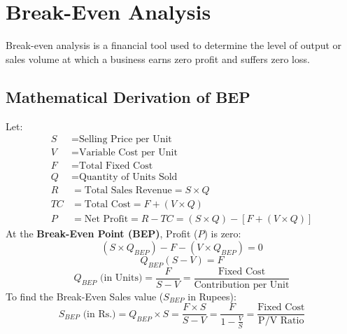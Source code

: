 \documentclass[12pt,a4paper]{article}
\begin{document}
\section{Break-Even Analysis}

Break-even analysis is a financial tool used to determine the level of output or sales volume at which a business earns zero profit and suffers zero loss.

\subsection{Mathematical Derivation of BEP}
Let:
\begin{align*}
  S &= \text{Selling Price per Unit} \\
  V &= \text{Variable Cost per Unit} \\
  F &= \text{Total Fixed Cost} \\
  Q &= \text{Quantity of Units Sold} \\
  R &= \text{Total Sales Revenue} = S \times Q \\
  TC &= \text{Total Cost} = F + (V \times Q) \\
  P &= \text{Net Profit} = R - TC = (S \times Q) - [F + (V \times Q)]
\end{align*}
At the \textbf{Break-Even Point (BEP)}, Profit ($P$) is zero:
\begin{equation*}
  (S \times Q_{BEP}) - F - (V \times Q_{BEP}) = 0
\end{equation*}
\begin{equation*}
  Q_{BEP} (S - V) = F
\end{equation*}
\begin{equation}
  Q_{BEP} \text{ (in Units)} = \frac{F}{S - V} = \frac{\text{Fixed Cost}}{\text{Contribution per Unit}}
\end{equation}
To find the Break-Even Sales value ($S_{BEP}$ in Rupees):
\begin{equation}
  S_{BEP} \text{ (in Rs.)} = Q_{BEP} \times S = \frac{F \times S}{S - V} = \frac{F}{1 - \frac{V}{S}} = \frac{\text{Fixed Cost}}{\text{P/V Ratio}}
\end{equation}
\end{document}

